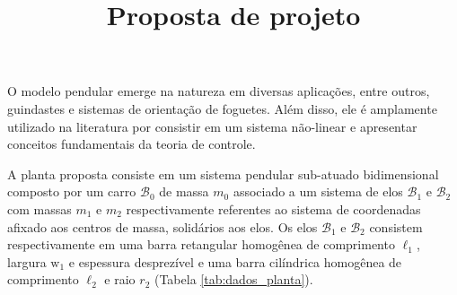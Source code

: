 \documentclass[a4paper, twoside, fleqn]{article}
\title{Proposta de projeto}
\author{\studentname \qquad \uspid \qquad \uspmail}
\begin{document}
    
    \maketitle
    \thispagestyle{fancy}

    O modelo pendular emerge na natureza em diversas aplicações, entre outros, guindastes e sistemas de orientação de foguetes. Além disso, ele é amplamente utilizado na literatura por consistir em um sistema não-linear e apresentar conceitos fundamentais da teoria de controle. 
    
    A planta proposta consiste em um sistema pendular sub-atuado bidimensional composto por um carro $\mathcal{B}_0$ de massa $m_0$ associado a um sistema de elos $\mathcal{B}_1$ e $\mathcal{B}_2$ com massas $m_1$ e $m_2$ respectivamente referentes ao sistema de coordenadas afixado aos centros de massa, solidários aos elos. Os elos $\mathcal{B}_1$ e $\mathcal{B}_2$ consistem respectivamente em uma barra retangular homogênea de comprimento $\ell_1$, largura $\mathrm{w}_1$ e espessura desprezível e uma barra cilíndrica homogênea de comprimento $\ell_2$ e raio $r_2$ (Tabela \ref{tab:dados_planta}).
    
\end{document}
